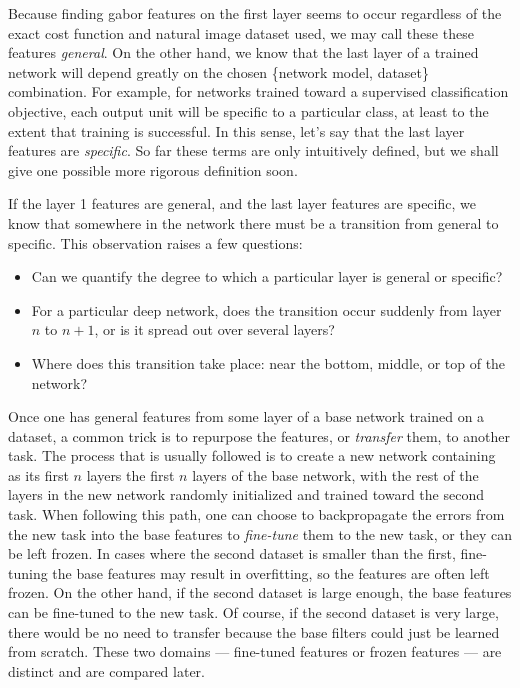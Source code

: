 Because finding gabor features on the first layer seems to occur regardless of the exact cost function and natural image dataset used, we may call these these features \emph{general}. On the other hand, we know that the last layer of a trained network will depend greatly on the chosen \{network model, dataset\} combination. For example, for networks trained toward a supervised classification objective, each output unit will be specific to a particular class, at least to the extent that training is successful. In this sense, let's say that the last layer features are \emph{specific}. So far these terms are only intuitively defined, but we shall give one possible more rigorous definition soon.

If the layer 1 features are general, and the last layer features are specific, we know that somewhere in the network there must be a transition from general to specific. This observation raises a few questions:

\begin{itemize}
	\item Can we quantify the degree to which a particular layer is general or specific?
	\item For a particular deep network, does the transition occur suddenly from layer $n$ to $n+1$, or is it spread out over several layers?
	\item Where does this transition take place: near the bottom, middle, or top of the network?
\end{itemize}

Once one has general features from some layer of a base network trained on a dataset, a common trick is to repurpose the features, or \emph{transfer} them, to another task. The process that is usually followed is to create a new network containing as its first $n$ layers the first $n$ layers of the base network, with the rest of the layers in the new network randomly initialized and trained toward the second task. When following this path, one can choose to backpropagate the errors from the new task into the base features to \emph{fine-tune} them to the new task, or they can be left frozen. In cases where the second dataset is smaller than the first, fine-tuning the base features may result in overfitting, so the features are often left frozen. On the other hand, if the second dataset is large enough, the base features can be fine-tuned to the new task. Of course, if the second dataset is very large, there would be no need to transfer because the base filters could just be learned from scratch. These two domains --- fine-tuned features or frozen features --- are distinct and are compared later.

